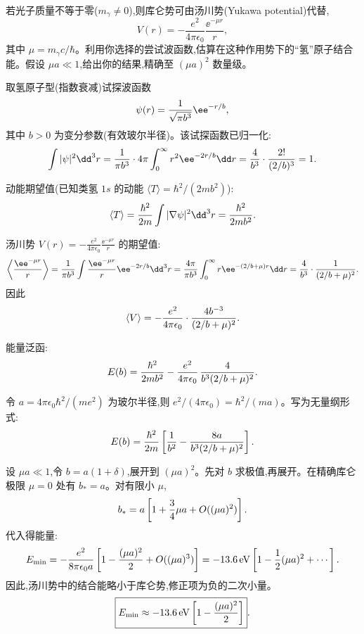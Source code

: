 \begin{question}
若光子质量不等于零($m_\gamma\ne0$),则库仑势可由汤川势(Yukawa potential)代替,
\[
V(r)=-\frac{e^2}{4\pi\epsilon_0}\frac{\ee^{-\mu r}}{r},
\]
其中 $\mu=m_\gamma c/\hbar$。利用你选择的尝试波函数,估算在这种作用势下的“氢”原子结合能。假设 $\mu a\ll1$,给出你的结果,精确至 $(\mu a)^2$ 数量级。
\begin{solution}
取氢原子型(指数衰减)试探波函数
\[
\psi(r)={1\over\sqrt{\pi b^3}}\ee^{-r/b},
\]
其中 $b>0$ 为变分参数(有效玻尔半径)。该试探函数已归一化:
\[
\int|\psi|^2\dd^3r={1\over\pi b^3}\cdot4\pi\int_0^\infty r^2 \ee^{-2r/b}\dd r
={4\over b^3}\cdot{2!\over(2/b)^3}=1.
\]

动能期望值(已知类氢 $1s$ 的动能 $\langle T\rangle=\hbar^2/(2mb^2)$):
\[
\langle T\rangle={\hbar^2\over2m}\int|\nabla\psi|^2\dd^3r={\hbar^2\over2mb^2}.
\]

汤川势 $V(r)=-\frac{e^2}{4\pi\epsilon_0}\frac{\ee^{-\mu r}}{r}$ 的期望值:
\[
\left\langle{\ee^{-\mu r}\over r}\right\rangle
={1\over\pi b^3}\int{\ee^{-\mu r}\over r}\ee^{-2r/b}\dd^3r
={4\pi\over\pi b^3}\int_0^\infty r \ee^{-(2/b+\mu)r}\dd r
={4\over b^3}\cdot{1\over(2/b+\mu)^2}.
\]
因此
\[
\langle V\rangle=-{e^2\over4\pi\epsilon_0}\cdot{4b^{-3}\over(2/b+\mu)^2}.
\]

能量泛函:
\[
E(b)={\hbar^2\over2mb^2}-{e^2\over4\pi\epsilon_0}\,{4\over b^3(2/b+\mu)^2}.
\]

令 $a=4\pi\epsilon_0\hbar^2/(me^2)$ 为玻尔半径,则 $e^2/(4\pi\epsilon_0)=\hbar^2/(ma)$。写为无量纲形式:
\[
E(b)={\hbar^2\over2m}\left[{1\over b^2}-{8a\over b^3(2/b+\mu)^2}\right].
\]

设 $\mu a\ll1$,令 $b=a(1+\delta)$,展开到 $(\mu a)^2$。先对 $b$ 求极值,再展开。在精确库仑极限 $\mu=0$ 处有 $b_*=a$。对有限小 $\mu$,
\[
b_*=a\left[1+{3\over4}\mu a+O((\mu a)^2)\right].
\]
代入得能量:
\[
E_{\min}=-{e^2\over8\pi\epsilon_0 a}\left[1-{(\mu a)^2\over2}+O((\mu a)^3)\right]
=-13.6\,\mathrm{eV}\left[1-{1\over2}(\mu a)^2+\cdots\right].
\]
因此,汤川势中的结合能略小于库仑势,修正项为负的二次小量。
\[
\boxed{E_{\min}\approx-13.6\,\mathrm{eV}\left[1-{(\mu a)^2\over2}\right]}.
\]
\end{solution}
\end{question}

